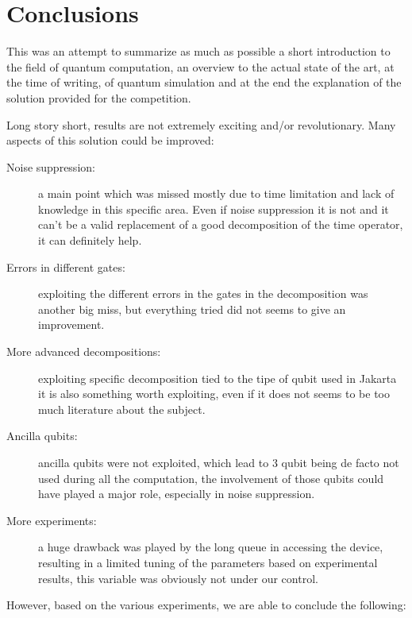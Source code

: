 \chapter{Conclusions}

This was an attempt to summarize as much as possible a short introduction to the field of quantum computation, an overview to the actual state of the art, at the time of writing, of quantum simulation and at the end the explanation of the solution provided for the competition.

Long story short, results are not extremely exciting and/or revolutionary. Many aspects of this solution could be improved:

\begin{description}
\item[Noise suppression: ]a main point which was missed mostly due to time limitation and lack of knowledge in this specific area. Even if noise suppression it is not and it can't be a valid replacement of a good decomposition of the time operator, it can definitely help.
\item[Errors in different gates: ] exploiting the different errors in the gates in the decomposition was another big miss, but everything tried did not seems to give an improvement.
\item[More advanced decompositions: ] exploiting specific decomposition tied to the tipe of qubit used in Jakarta it is also something worth exploiting, even if it does not seems to be too much literature about the subject.
\item[Ancilla qubits: ] ancilla qubits were not exploited, which lead to 3 qubit being de facto not used during all the computation, the involvement of those qubits could have played a major role, especially in noise suppression.
\item[More experiments: ] a huge drawback was played by the long queue in accessing the device, resulting in a limited tuning of the parameters based on experimental results, this variable was obviously not under our control.
\end{description}

However, based on the various experiments, we are able to conclude the following:

